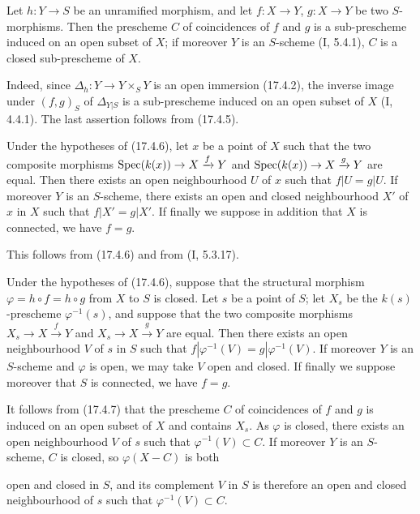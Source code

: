 \begin{proposition}[17.4.6]
\label{IV.17.4.6}
Let $h:Y\to S$ be an unramified morphism, and let $f:X\to Y$, $g:X\to Y$ be two $S$-morphisms. Then the prescheme $C$ of coincidences of $f$ and $g$ is a sub-prescheme induced on an open subset of $X$; if moreover $Y$ is an $S$-scheme (I, 5.4.1), $C$ is a closed sub-prescheme of $X$.
\end{proposition}

Indeed, since $\Delta_h:Y\to Y\times_S Y$ is an open immersion (17.4.2), the inverse image under $(f,g)_S$ of $\Delta_{Y|S}$ is a sub-prescheme induced on an open subset of $X$ (I, 4.4.1). The last assertion follows from (17.4.5).

\begin{corollary}[17.4.7]
\label{IV.17.4.7}
Under the hypotheses of (17.4.6), let $x$ be a point of $X$ such that the two composite morphisms $\operatorname{Spec}(k(x))\to X\xrightarrow{f}Y$ and $\operatorname{Spec}(k(x))\to X\xrightarrow{g}Y$ are equal. Then there exists an open neighbourhood $U$ of $x$ such that $f|U=g|U$. If moreover $Y$ is an $S$-scheme, there exists an open and closed neighbourhood $X'$ of $x$ in $X$ such that $f|X'=g|X'$. If finally we suppose in addition that $X$ is connected, we have $f=g$.
\end{corollary}

This follows from (17.4.6) and from (I, 5.3.17).

\begin{corollary}[17.4.8]
\label{IV.17.4.8}
Under the hypotheses of (17.4.6), suppose that the structural morphism $\varphi=h\circ f=h\circ g$ from $X$ to $S$ is closed. Let $s$ be a point of $S$; let $X_s$ be the $k(s)$-prescheme $\varphi^{-1}(s)$, and suppose that the two composite morphisms $X_s\to X\xrightarrow{f}Y$ and $X_s\to X\xrightarrow{g}Y$ are equal. Then there exists an open neighbourhood $V$ of $s$ in $S$ such that $f|\varphi^{-1}(V)=g|\varphi^{-1}(V)$. If moreover $Y$ is an $S$-scheme and $\varphi$ is open, we may take $V$ open and closed. If finally we suppose moreover that $S$ is connected, we have $f=g$.
\end{corollary}

It follows from (17.4.7) that the prescheme $C$ of coincidences of $f$ and $g$ is induced on an open subset of $X$ and contains $X_s$. As $\varphi$ is closed, there exists an open neighbourhood $V$ of $s$ such that $\varphi^{-1}(V)\subset C$. If moreover $Y$ is an $S$-scheme, $C$ is closed, so $\varphi(X-C)$ is both

open and closed in $S$, and its complement $V$ in $S$ is therefore an open and closed neighbourhood of $s$ such that $\varphi^{-1}(V)\subset C$.

